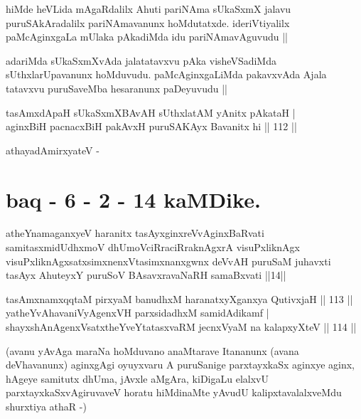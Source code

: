\begin{artha}
hiMde heVLida mAgaRdalilx Ahuti pariNAma sUkaSxmX jalavu
puruSAkAradalilx pariNAmavanunx hoMdutatxde. ideriVtiyalilx
paMcAginxgaLa mUlaka pAkadiMda idu pariNAmavAguvudu ||
\end{artha}


\begin{artha}
adariMda sUkaSxmXvAda jalatatavxvu pAka visheVSadiMda
sUthxlarUpavanunx hoMduvudu. paMcAginxgaLiMda pakavxvAda Ajala
tatavxvu puruSaveMba hesaranunx paDeyuvudu ||
\end{artha}


\begin{shl}
tasAmxdApaH sUkaSxmXBAvAH sUthxlatAM yAnitx pAkataH | \\
aginxBiH pacnacxBiH pakAvxH puruSAKAyx Bavanitx hi \hfill|| 112 || 
\end{shl}

 athayadAmirxyateV -

\section*{baq - 6 - 2 - 14 kaMDike.}

\begin{shl}
atheYnamaganxyeV haranitx tasAyxginxreVvAginxBaRvati samitasxmidUdhxmoV dhUmoV\s ciRraciRraknAgxrA visuPxliknAgx visuPxliknAgxsatxsimxnenxVtasimxnanxgwnx deVvAH puruSaM juhavxti tasAyx AhuteyxY puruSoV BAsavxravaNaRH samaBxvati ||14||
\end{shl}

\begin{shl}
tasAmxnamxqqtaM pirxyaM banudhxM haranatxyXganxya QutivxjaH \hfill|| 113 || \\
yatheYvA\s \s havaniVyAgenxVH parxsidadhxM samidAdikamf | \\
shayxshAnAgenxVsatxtheYveYtatasxvaRM jecnxVyaM na kalapxyXteV \hfill|| 114 || 
\end{shl}

\begin{artha}
(avanu yAvAga maraNa hoMduvano anaMtarave Itananunx (avana
  deVhavanunx) aginxgAgi oyuyxvaru A puruSanige parxtayxkaSx aginxye
  aginx, hAgeye samitutx dhUma, jAvxle aMgAra, kiDigaLu elalxvU
  parxtayxkaSxvAgiruvaveV horatu hiMdinaMte yAvudU kalipxtavalalxveMdu
  shurxtiya athaR -)
\end{artha}


